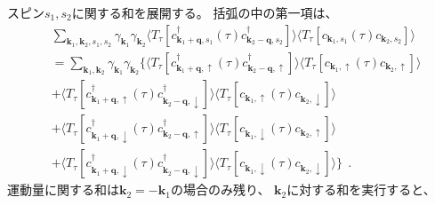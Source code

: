 \documentclass[a4j]{jsarticle}
\begin{document}
スピン$s_{1},s_{2}$に関する和を展開する。
括弧の中の第一項は、
\begin{align}
	 &
	\sum_{\bm{k}_{1} , \bm{k}_{2} , s_{1} ,s_{2} }
	\gamma_{\bm{k}_{1}}
	\gamma_{\bm{k}_{2}}
	\langle T_{\tau} [
			c_{ \bm{k}_{1}+\bm{q} , s_{1} }^{\dagger} (\tau)
			c_{ \bm{k}_{2}-\bm{q} , s_{2} }^{\dagger}
		] \rangle
	\langle T_{\tau} [
			c_{ \bm{k}_{1} , s_{1} } (\tau)
			c_{ \bm{k}_{2} , s_{2} }
		] \rangle
	\\ &=
	\sum_{\bm{k}_{1} , \bm{k}_{2} }
	\gamma_{\bm{k}_{1}}
	\gamma_{\bm{k}_{2}}
	\Big\{
	\langle T_{\tau} [
			c_{ \bm{k}_{1}+\bm{q} , \uparrow }^{\dagger} (\tau)
			c_{ \bm{k}_{2}-\bm{q} , \uparrow }^{\dagger}
		] \rangle
	\langle T_{\tau} [
			c_{ \bm{k}_{1} , \uparrow } (\tau)
			c_{ \bm{k}_{2} , \uparrow }
		] \rangle
	\nonumber \\ &
	+
	\langle T_{\tau} [
			c_{ \bm{k}_{1}+\bm{q} , \uparrow }^{\dagger} (\tau)
			c_{ \bm{k}_{2}-\bm{q} , \downarrow }^{\dagger}
		] \rangle
	\langle T_{\tau} [
			c_{ \bm{k}_{1} , \uparrow } (\tau)
			c_{ \bm{k}_{2} , \downarrow }
		] \rangle
	\nonumber \\[2mm] &
	+
	\langle T_{\tau} [
			c_{ \bm{k}_{1}+\bm{q} , \downarrow }^{\dagger} (\tau)
			c_{ \bm{k}_{2}-\bm{q} , \uparrow }^{\dagger}
		] \rangle
	\langle T_{\tau} [
			c_{ \bm{k}_{1} , \downarrow } (\tau)
			c_{ \bm{k}_{2} , \uparrow }
		] \rangle
	\nonumber \\[2mm] &
	+
	\langle T_{\tau} [
			c_{ \bm{k}_{1}+\bm{q} , \downarrow }^{\dagger} (\tau)
			c_{ \bm{k}_{2}-\bm{q} , \downarrow }^{\dagger}
		] \rangle
	\langle T_{\tau} [
			c_{ \bm{k}_{1} , \downarrow } (\tau)
			c_{ \bm{k}_{2} , \downarrow }
		] \rangle
	\Big\}
	\ \ .
\end{align}
運動量に関する和は$\bm{k}_{2}=-\bm{k}_{1}$の場合のみ残り、
$\bm{k}_{2}$に対する和を実行すると、
\end{document}
